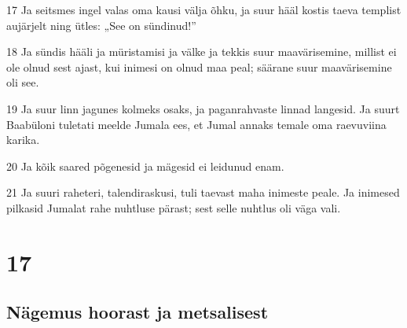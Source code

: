 \par 17 Ja seitsmes ingel valas oma kausi välja õhku, ja suur hääl kostis taeva templist aujärjelt ning ütles: „See on sündinud!”
\par 18 Ja sündis hääli ja müristamisi ja välke ja tekkis suur maavärisemine, millist ei ole olnud sest ajast, kui inimesi on olnud maa peal; säärane suur maavärisemine oli see.
\par 19 Ja suur linn jagunes kolmeks osaks, ja paganrahvaste linnad langesid. Ja suurt Baabüloni tuletati meelde Jumala ees, et Jumal annaks temale oma raevuviina karika.
\par 20 Ja kõik saared põgenesid ja mägesid ei leidunud enam.
\par 21 Ja suuri raheteri, talendiraskusi, tuli taevast maha inimeste peale. Ja inimesed pilkasid Jumalat rahe nuhtluse pärast; sest selle nuhtlus oli väga vali.


\chapter{17}

\section*{Nägemus hoorast ja metsalisest}

